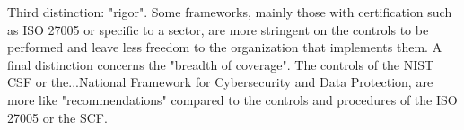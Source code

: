 Third distinction: "rigor". Some frameworks, mainly those with certification such as ISO 27005 or specific to a sector, are more stringent on the controls to be performed and leave less freedom to the organization that implements them.\newline
A final distinction concerns the "breadth of coverage". The controls of the NIST CSF or the...National Framework for Cybersecurity and Data Protection, are more like "recommendations" compared to the controls and procedures of the ISO 27005 or the SCF. 